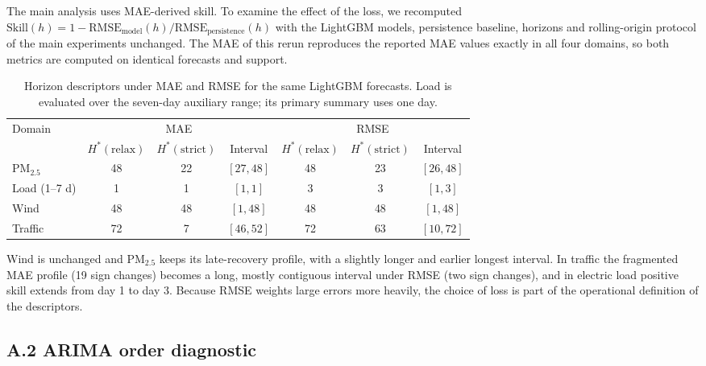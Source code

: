 \documentclass[pdflatex]{sn-jnl}
\begin{document}
The main analysis uses MAE-derived skill. To examine the effect of the loss,
we recomputed $\mathrm{Skill}(h)=1-\mathrm{RMSE}_{\mathrm{model}}(h)/\mathrm{RMSE}_{\mathrm{persistence}}(h)$
with the LightGBM models, persistence baseline, horizons and rolling-origin
protocol of the main experiments unchanged. The MAE of this rerun reproduces
the reported MAE values exactly in all four domains, so both metrics are
computed on identical forecasts and support.
\begin{table}[h]
\centering
\small
\begin{tabular}{@{}lcccccc@{}}
\toprule
Domain & \multicolumn{3}{c}{MAE} & \multicolumn{3}{c}{RMSE} \\
\cmidrule(lr){2-4}\cmidrule(lr){5-7}
 & $H^*(\mathrm{relax})$ & $H^*(\mathrm{strict})$ & Interval & $H^*(\mathrm{relax})$ & $H^*(\mathrm{strict})$ & Interval \\
\midrule
PM$_{2.5}$ & 48 & 22 & $[27,48]$ & 48 & 23 & $[26,48]$ \\
Load (1--7 d) & 1 & 1 & $[1,1]$ & 3 & 3 & $[1,3]$ \\
Wind & 48 & 48 & $[1,48]$ & 48 & 48 & $[1,48]$ \\
Traffic & 72 & 7 & $[46,52]$ & 72 & 63 & $[10,72]$ \\
\bottomrule
\end{tabular}
\caption{Horizon descriptors under MAE and RMSE for the same LightGBM forecasts.
Load is evaluated over the seven-day auxiliary range; its primary summary uses one day.}
\label{tab:metric-sensitivity}
\end{table}
Wind is unchanged and PM$_{2.5}$ keeps its late-recovery profile, with a slightly
longer and earlier longest interval. In traffic the fragmented MAE profile
(19 sign changes) becomes a long, mostly contiguous interval under RMSE (two sign
changes), and in electric load positive skill extends from day 1 to day 3.
Because RMSE weights large errors more heavily, the choice of loss is part of the
operational definition of the descriptors.

\subsection*{A.2 ARIMA order diagnostic}
\end{document}
